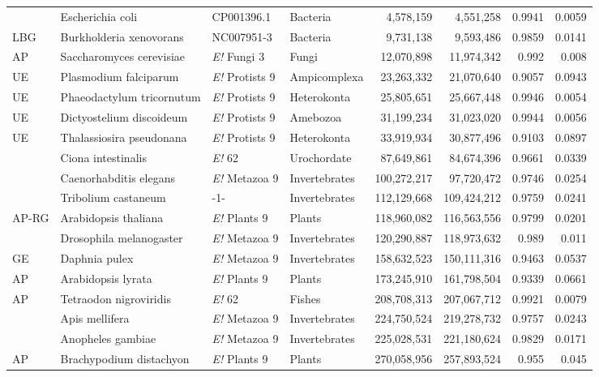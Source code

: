 \begin{table}[htbp]
{\begin{tabular}{ l l p{62pt} l r r r r }
 & Escherichia coli & CP001396.1 & Bacteria & 4,578,159 & 4,551,258 & 0.9941 & 0.0059 \\
LBG & Burkholderia xenovorans & NC007951-3 & Bacteria & 9,731,138 & 9,593,486 & 0.9859 & 0.0141 \\
AP & Saccharomyces cerevisiae & {\it E!} Fungi 3 & Fungi & 12,070,898 & 11,974,342 & 0.992 & 0.008 \\
UE & Plasmodium falciparum & {\it E!} Protists 9 & Ampicomplexa & 23,263,332 & 21,070,640 & 0.9057 & 0.0943 \\
UE & Phaeodactylum tricornutum & {\it E!} Protists 9 & Heterokonta & 25,805,651 & 25,667,448 & 0.9946 & 0.0054 \\
UE & Dictyostelium discoideum & {\it E!} Protists 9 & Amebozoa & 31,199,234 & 31,023,020 & 0.9944 & 0.0056 \\
UE & Thalassiosira pseudonana & {\it E!} Protists 9 & Heterokonta & 33,919,934 & 30,877,496 & 0.9103 & 0.0897 \\
 & Ciona intestinalis & {\it E!} 62 & Urochordate & 87,649,861 & 84,674,396 & 0.9661 & 0.0339 \\
 & Caenorhabditis elegans & {\it E!} Metazoa 9 & Invertebrates & 100,272,217 & 97,720,472 & 0.9746 & 0.0254 \\
 & Tribolium castaneum & -1- & Invertebrates & 112,129,668 & 109,424,212 & 0.9759 & 0.0241 \\
AP-RG & Arabidopsis thaliana & {\it E!} Plants 9 & Plants & 118,960,082 & 116,563,556 & 0.9799 & 0.0201 \\
 & Drosophila melanogaster & {\it E!} Metazoa 9 & Invertebrates & 120,290,887 & 118,973,632 & 0.989 & 0.011 \\
GE & Daphnia pulex & {\it E!} Metazoa 9 & Invertebrates & 158,632,523 & 150,111,316 & 0.9463 & 0.0537 \\
AP & Arabidopsis lyrata & {\it E!} Plants 9 & Plants & 173,245,910 & 161,798,504 & 0.9339 & 0.0661 \\
AP & Tetraodon nigroviridis & {\it E!} 62 & Fishes & 208,708,313 & 207,067,712 & 0.9921 & 0.0079 \\
 & Apis mellifera & {\it E!} Metazoa 9 & Invertebrates & 224,750,524 & 219,278,732 & 0.9757 & 0.0243 \\
 & Anopheles gambiae & {\it E!} Metazoa 9 & Invertebrates & 225,028,531 & 221,180,624 & 0.9829 & 0.0171 \\
AP & Brachypodium distachyon & {\it E!} Plants 9 & Plants & 270,058,956 & 257,893,524 & 0.955 & 0.045 \\

\end{tabular}}
\end{table}

